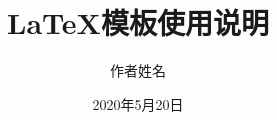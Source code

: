 \documentclass[unicode,master]{scutthesis}	%
\begin{document}
	\title{LaTeX模板使用说明}	
	\author{作者姓名}	
	\date{2020年5月20日}
	\maketitle	
	\frontmatter	%
	\tableofcontents	%
	
	\begingroup
		\renewcommand*{\addvspace}[1]{}
		\newcommand{\loflabel}{图} 
		\renewcommand{\numberline}[1]{\loflabel~#1\hspace*{1em}}	
		\listoffigures
		
		\newcommand{\lotlabel}{表}
		\renewcommand{\numberline}[1]{\lotlabel~#1\hspace*{1em}}
		\listoftables
	\endgroup

	
	\mainmatter %
	
    \pagestyle{fancy}	%
	
\end{document}
